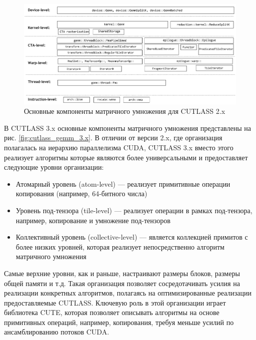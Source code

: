 \begin{figure}
    \centering
    \includegraphics[scale=0.45]{src/images/cutlass-gemm-components.png}
    \caption{Основные компоненты матричного умножения для CUTLASS 2.x}
    \label{fig:cutlass_gemm}
\end{figure}


В CUTLASS 3.x основные компоненты матричного умножения представлены на рис. \ref{fig:cutlass_gemm_3.x}. В отличии от версии 2.x, где организация
полагалась на иерархию параллелизма CUDA, CUTLASS 3.x вместо этого реализует алгоритмы которые являются более универсальными и предоставляет следующие
уровни организации:
\begin{itemize}
    \item Атомарный уровень (atom-level) — реализует примитивные операции копирования (например, 64-битного числа)
    \item Уровень под-тензора (tile-level) — реализует операции в рамках под-тензора, например, копирование и умножение под-тензоров
    \item Коллективный уровень (collective-level) — является коллекцией примитов с более низких уровней, которая реализует непосредственно алгоритм матричного умножения
\end{itemize}
Самые верхние уровни, как и раньше, настраивают размеры блоков, размеры общей памяти и т.д. Такая организация позволяет сосредотачивать усилия
на реализации конкретных алгоритмов, полагаясь на оптимизированные реализации предоставляемые CUTLASS. Ключевую роль в этой организации играет
библиотека CUTE, которая позволяет описывать алгоритмы на основе примитивных операций, например, копирования, требуя меньше усилий по ансамблированию
потоков CUDA.

